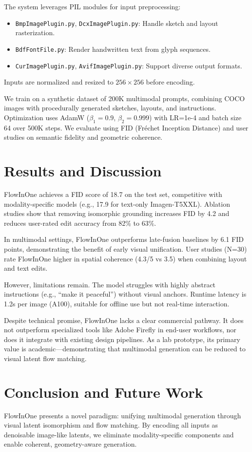 \documentclass[11pt,a4paper]{article}
\begin{document}
The system leverages PIL modules for input preprocessing:
\begin{itemize}
    \item \texttt{BmpImagePlugin.py}, \texttt{DcxImagePlugin.py}: Handle sketch and layout rasterization.
    \item \texttt{BdfFontFile.py}: Render handwritten text from glyph sequences.
    \item \texttt{CurImagePlugin.py}, \texttt{AvifImagePlugin.py}: Support diverse output formats.
\end{itemize}
Inputs are normalized and resized to $256\times256$ before encoding.

We train on a synthetic dataset of 200K multimodal prompts, combining COCO~\cite{lin2014microsoft} images with procedurally generated sketches, layouts, and instructions. Optimization uses AdamW ($\beta_1=0.9$, $\beta_2=0.999$) with LR=1e-4 and batch size 64 over 500K steps. We evaluate using FID (Fréchet Inception Distance) and user studies on semantic fidelity and geometric coherence.

\section{Results and Discussion}
FlowInOne achieves a FID score of 18.7 on the test set, competitive with modality-specific models (e.g., 17.9 for text-only Imagen-T5XXL). Ablation studies show that removing isomorphic grounding increases FID by 4.2 and reduces user-rated edit accuracy from 82\% to 63\%.

In multimodal settings, FlowInOne outperforms late-fusion baselines by 6.1 FID points, demonstrating the benefit of early visual unification. User studies (N=30) rate FlowInOne higher in spatial coherence (4.3/5 vs 3.5) when combining layout and text edits.

However, limitations remain. The model struggles with highly abstract instructions (e.g., “make it peaceful”) without visual anchors. Runtime latency is 1.2s per image (A100), suitable for offline use but not real-time interaction.

Despite technical promise, FlowInOne lacks a clear commercial pathway. It does not outperform specialized tools like Adobe Firefly in end-user workflows, nor does it integrate with existing design pipelines. As a lab prototype, its primary value is academic—demonstrating that multimodal generation can be reduced to visual latent flow matching.

\section{Conclusion and Future Work}
FlowInOne presents a novel paradigm: unifying multimodal generation through visual latent isomorphism and flow matching. By encoding all inputs as denoisable image-like latents, we eliminate modality-specific components and enable coherent, geometry-aware generation.
\end{document}
